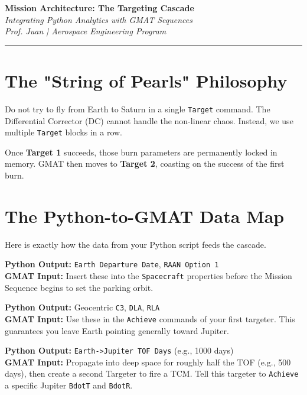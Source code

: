 \documentclass[11pt, letterpaper]{article}
\begin{document}
\begin{center}
    {\Large \textbf{Mission Architecture: The Targeting Cascade}} \\
    \vspace{0.2cm}
    {\large \textit{Integrating Python Analytics with GMAT Sequences}} \\
    \vspace{0.4cm}
    \textit{Prof. Juan | Aerospace Engineering Program}
\end{center}
\hrule
\vspace{0.5cm}

\section*{The "String of Pearls" Philosophy}
Do not try to fly from Earth to Saturn in a single \texttt{Target} command. The Differential Corrector (DC) cannot handle the non-linear chaos. Instead, we use multiple \texttt{Target} blocks in a row. 

Once \textbf{Target 1} succeeds, those burn parameters are permanently locked in memory. GMAT then moves to \textbf{Target 2}, coasting on the success of the first burn.

\section*{The Python-to-GMAT Data Map}
Here is exactly how the data from your Python script feeds the cascade.

\begin{tcolorbox}[colback=blue!5!white,colframe=blue!75!black,title=1. Spacecraft Initialization]
\textbf{Python Output:} \texttt{Earth Departure Date}, \texttt{RAAN Option 1} \\
\textbf{GMAT Input:} Insert these into the \texttt{Spacecraft} properties before the Mission Sequence begins to set the parking orbit.
\end{tcolorbox}

\begin{tcolorbox}[colback=green!5!white,colframe=green!75!black,title=2. Target 1: Trans-Jupiter Injection (TJI)]
\textbf{Python Output:} Geocentric \texttt{C3}, \texttt{DLA}, \texttt{RLA} \\
\textbf{GMAT Input:} Use these in the \texttt{Achieve} commands of your first targeter. This guarantees you leave Earth pointing generally toward Jupiter.
\end{tcolorbox}

\begin{tcolorbox}[colback=orange!5!white,colframe=orange!75!black,title=3. Target 2: Deep Space TCM (Hitting Jupiter)]
\textbf{Python Output:} \texttt{Earth->Jupiter TOF Days} (e.g., 1000 days) \\
\textbf{GMAT Input:} Propagate into deep space for roughly half the TOF (e.g., 500 days), then create a second Targeter to fire a TCM. Tell this targeter to \texttt{Achieve} a specific Jupiter \texttt{BdotT} and \texttt{BdotR}.
\end{tcolorbox}
\end{document}
